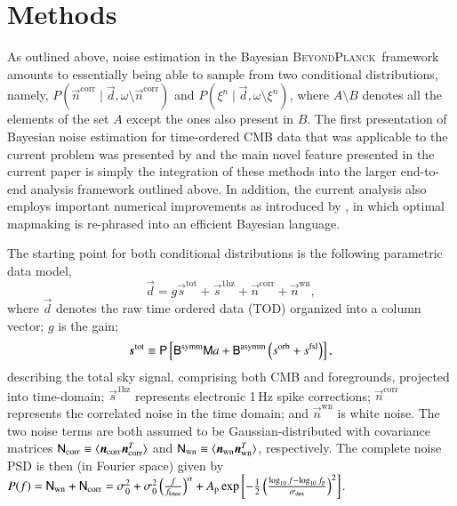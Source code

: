 \documentclass{aa}
\renewcommand{\d}[0]{\vec{d}}
\newcommand{\n}[0]{\vec{n}}
\newcommand{\s}[0]{\vec{s}}
\newcommand{\B}[0]{\tens{B}}
\newcommand{\M}[0]{\tens{M}}
\renewcommand{\P}[0]{\tens{P}}
\newcommand{\BP}{\textsc{BeyondPlanck}}
\begin{document}
\section{Methods}
\label{sec:methods}

As outlined above, noise estimation in the Bayesian \BP\ framework
amounts to essentially being able to sample from two conditional
distributions, namely, $P(\n^{\mathrm{corr}}\mid\d, \omega\setminus
\n^{\mathrm{corr}})$ and $P(\xi^n\mid \d, \omega\setminus\xi^n)$, 
where $A \setminus B$ denotes all the elements of the set $A$ except 
the ones also present in $B$. The 
first presentation of Bayesian noise estimation for time-ordered CMB
data that was applicable to the current problem was presented by
\citet{wehus:2012} and the main novel feature presented in the
current paper is simply the integration of these methods into the
larger end-to-end analysis framework outlined above. In addition, the
current analysis also employs important numerical improvements as
introduced by \citet{bp02}, in which optimal mapmaking is re-phrased
into an efficient Bayesian language.

The starting point for both conditional distributions is the following
parametric data model,
\begin{equation}
 \d = g \s^{\mathrm{tot}} + \s^{\mathrm{1hz}} + \n^{\mathrm{corr}} + \n^{\mathrm{wn}},
\end{equation}
where $\d$ denotes the raw time ordered data (TOD) organized into a
column vector; $g$ is the gain; 
\begin{equation}
 \s^\mathrm{tot} \equiv \P\left[\B^{\mathrm{symm}}
 \M a  + \B^{\mathrm{asymm}}\left(s^{\mathrm{orb}} 
 + s^{\mathrm{fsl}}\right)\right],
\end{equation}
describing the total sky signal, comprising both CMB and foregrounds,
projected into time-domain; $\s^{\mathrm{1hz}}$ represents electronic 1\,Hz spike corrections; $\n^\mathrm{corr}$ represents the
correlated noise in the time domain; and $\n^\mathrm{wn}$ is white
noise. The two noise terms are both assumed to be Gaussian-distributed
with covariance matrices $\mathsf{N}_\mathrm{corr} \equiv \langle
\boldsymbol{n}_\mathrm{corr} \boldsymbol{n}_\mathrm{corr}^{T}  \rangle$ and
$\mathsf{N}_\mathrm{wn} \equiv \langle \boldsymbol{n}_\mathrm{wn}
\boldsymbol{n}_\mathrm{wn}^{T}  \rangle$, respectively. The complete noise PSD
is then (in Fourier space) given by $P(f) = \mathsf{N}_\mathrm{wn} + \mathsf{N}_\mathrm{corr} =
\sigma_0^2 + \sigma_0^2\left(\frac{f}{f_\mathrm{knee}}\right)^\alpha + A_\mathrm{p} \exp\left[-\frac{1}{2}\left(\frac{\log_{10}f - \log_{10} f_\mathrm{p}}{\sigma_\mathrm{dex}}\right)^2\right]$. 
\end{document}

